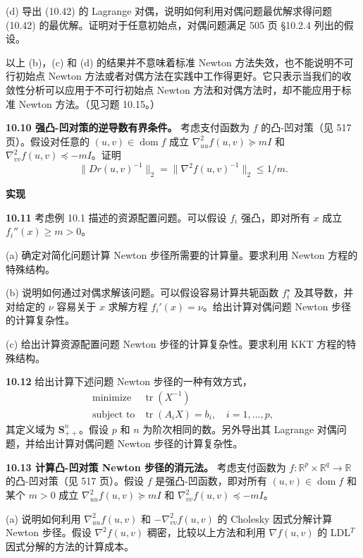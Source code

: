 \documentclass[UTF8, 12pt, fontset=fandol, oneside]{ctexart}
\begin{document}
(d) 导出 (10.42) 的 Lagrange 对偶，说明如何利用对偶问题最优解求得问题 (10.42) 的最优解。证明对于任意初始点，对偶问题满足 505 页 \S10.2.4 列出的假设。

以上 (b)，(c) 和 (d) 的结果并不意味着标准 Newton 方法失效，也不能说明不可行初始点 Newton 方法或者对偶方法在实践中工作得更好。它只表示当我们的收敛性分析可以应用于不可行初始点 Newton 方法和对偶方法时，却不能应用于标准 Newton 方法。（见习题 10.15。）

\noindent\textbf{10.10 强凸-凹对策的逆导数有界条件。}\quad
考虑支付函数为 $f$ 的凸-凹对策（见 517 页）。假设对任意的 $(u,v)\in\operatorname{dom} f$ 成立 $\nabla_{uu}^2 f(u,v)\succeq mI$ 和 $\nabla_{vv}^2 f(u,v)\preceq -mI$。证明
\[
\|Dr(u,v)^{-1}\|_2=\|\nabla^2 f(u,v)^{-1}\|_2\leq 1/m.
\]

\noindent\textbf{实现}

\noindent\textbf{10.11}\quad
考虑例 10.1 描述的资源配置问题。可以假设 $f_i$ 强凸，即对所有 $x$ 成立 $f_i''(x)\geq m>0$。

(a) 确定对简化问题计算 Newton 步径所需要的计算量。要求利用 Newton 方程的特殊结构。

(b) 说明如何通过对偶求解该问题。可以假设容易计算共轭函数 $f_i^\star$ 及其导数，并对给定的 $\nu$ 容易关于 $x$ 求解方程 $f_i'(x)=\nu$。给出计算对偶问题 Newton 步径的计算复杂性。

(c) 给出计算资源配置问题 Newton 步径的计算复杂性。要求利用 KKT 方程的特殊结构。

\noindent\textbf{10.12}\quad
给出计算下述问题 Newton 步径的一种有效方式，
\[
\begin{array}{ll}
\mbox{minimize} & \operatorname{tr}(X^{-1})\\
\mbox{subject to} & \operatorname{tr}(A_iX)=b_i,\quad i=1,\ldots,p,
\end{array}
\]
其定义域为 $\mathbf{S}_{++}^n$。假设 $p$ 和 $n$ 为阶次相同的数。另外导出其 Lagrange 对偶问题，并给出计算对偶问题 Newton 步径的计算复杂性。

\noindent\textbf{10.13 计算凸-凹对策 Newton 步径的消元法。}\quad
考虑支付函数为 $f:\mathbb{R}^p\times\mathbb{R}^q\to\mathbb{R}$ 的凸-凹对策（见 517 页）。假设 $f$ 是强凸-凹函数，即对所有 $(u,v)\in\operatorname{dom} f$ 和某个 $m>0$ 成立 $\nabla_{uu}^2 f(u,v)\succeq mI$ 和 $\nabla_{vv}^2 f(u,v)\preceq -mI$。

(a) 说明如何利用 $\nabla_{uu}^2f(u,v)$ 和 $-\nabla_{vv}^2f(u,v)$ 的 Cholesky 因式分解计算 Newton 步径。假设 $\nabla^2f(u,v)$ 稠密，比较以上方法和利用 $\nabla f(u,v)$ 的 LDL$^T$ 因式分解的方法的计算成本。
\end{document}
